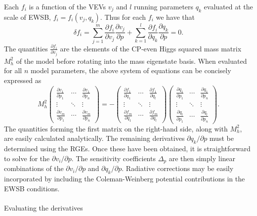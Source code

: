 \documentclass[preprint,amsmath,amssymb,aps,superscriptaddress,prd,showpacs,floatfix,nofootinbib]{revtex4-1}
\begin{document}
Each $f_i$ is a function of the VEVs $v_j$ and $l$ running parameters
$q_k$ evaluated at the scale of EWSB, $f_i=f_i(v_j,q_k)$. Thus for
each $f_i$ we have that
\begin{equation}\label{eq:EWSBchainrule}
\delta f_i = \sum_{j=1}^m \frac{\partial f_i}{\partial
  v_j}\frac{\partial v_j}{\partial p}+\sum_{k=1}^l \frac{\partial
  f_i}{\partial q_k}\frac{\partial q_k}{\partial p}=0.
\end{equation}
The quantities $\frac{\partial f_i}{\partial v_j}$ are the elements of
the CP-even Higgs squared mass matrix $M_h^2$ of the model before
rotating into the mass eigenstate basis. When evaluated for all $n$
model parameters, the above system of equations can be concisely
expressed as
\begin{equation}\label{eq:tuningsystem}
M_h^2\begin{pmatrix}
\frac{\partial v_1}{\partial p_1} & \cdots & \frac{\partial v_1}{\partial p_n} \\
\vdots & \ddots & \vdots \\
\frac{\partial v_m}{\partial p_1} & \cdots & \frac{\partial v_m}{\partial p_n}
\end{pmatrix}=
-\begin{pmatrix}
\frac{\partial f_1}{\partial q_1} & \cdots & \frac{\partial f_1}{\partial q_l} \\
\vdots & \ddots & \vdots \\
\frac{\partial f_m}{\partial q_1} & \cdots & \frac{\partial f_m}{\partial q_l}
\end{pmatrix}
\begin{pmatrix}
\frac{\partial q_1}{\partial p_1} & \cdots & \frac{\partial q_1}{\partial p_n} \\
\vdots & \ddots & \vdots \\
\frac{\partial q_l}{\partial p_1} & \cdots & \frac{\partial q_l}{\partial p_n}
\end{pmatrix}.
\end{equation} 
The quantities forming the first matrix on the right-hand side, along
with $M_h^2$, are easily calculated analytically. The remaining
derivatives $\partial q_k /\partial p$ must be determined using the
RGEs. Once these have been obtained, it is straightforward to solve
for the $\partial v_i /\partial p$. The sensitivity coefficients
$\Delta_p$ are then simply linear combinations of the $\partial
v_i/\partial p$ and $\partial q_k/\partial p$. Radiative corrections
may be easily incorporated by including the Coleman-Weinberg potential
contributions in the EWSB conditions.\\ \\ Evaluating the derivatives
\end{document}
